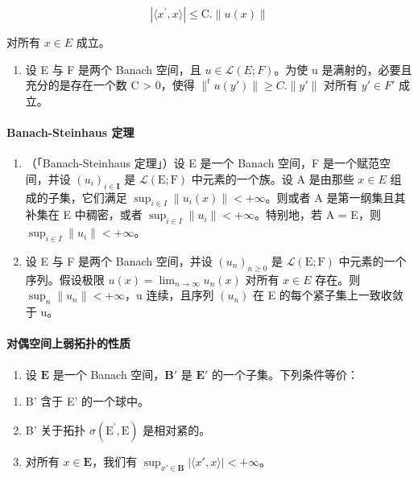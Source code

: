 \[
\left| \langle x ^ {\prime}, x \rangle \right| \leqslant \mathrm{C.} \| u (x) \|\tag{7}
\]

对所有 \(x \in E\) 成立。

\begin{enumerate}
\def\labelenumi{(\arabic{enumi})}
\setcounter{enumi}{14}
\tightlist
\item
   设 E 与 F 是两个 Banach 空间，且 \(u \in \mathcal{L}(E; F)\)。为使 u 是满射的，必要且充分的是存在一个数 C \textgreater{} 0，使得 \(\|^{t}u(y')\| \geqslant C. \|y'\|\) 对所有 \(y' \in F'\) 成立。
\end{enumerate}

\paragraph{Banach-Steinhaus 定理}

\begin{enumerate}
\def\labelenumi{\arabic{enumi})}
\setcounter{enumi}{15}
\item
  （「Banach-Steinhaus 定理」）设 E 是一个 Banach 空间，F 是一个赋范空间，并设 \((u_{i})_{i\in\mathbf{I}}\) 是 \(\mathcal{L}(\mathrm{E};\mathrm{F})\) 中元素的一个族。设 A 是由那些 \(x\in E\) 组成的子集，它们满足 \(\sup_{i\in I}\|u_{i}(x)\|<+\infty\)。则或者 A 是第一纲集且其补集在 E 中稠密，或者 \(\sup_{i\in I}\|u_{i}\|<+\infty\)。特别地，若 A = E，则 \(\sup_{i\in I}\|u_{i}\|<+\infty\)。
\item
  设 E 与 F 是两个 Banach 空间，并设 \((u_{n})_{n\geq0}\) 是 \(\mathcal{L}(\mathrm{E};\mathrm{F})\) 中元素的一个序列。假设极限 \(u(x)=\lim_{n\to\infty}u_{n}(x)\) 对所有 \(x\in E\) 存在。则 \(\sup_{n}\|u_{n}\|<+\infty\)，u 连续，且序列 \((u_{n})\) 在 E 的每个紧子集上一致收敛于 u。
\end{enumerate}

\paragraph{对偶空间上弱拓扑的性质}

\begin{enumerate}
\def\labelenumi{\arabic{enumi})}
\setcounter{enumi}{17}
\tightlist
\item
  设 \(\mathbf{E}\) 是一个 Banach 空间，\(\mathbf{B}'\) 是 \(\mathbf{E}'\) 的一个子集。下列条件等价：
\end{enumerate}

\begin{enumerate}
\def\labelenumi{(\roman{enumi})}
\item
  B' 含于 E' 的一个球中。
\item
  B' 关于拓扑 \(\sigma(\mathrm{E}^{\prime}, \mathrm{E})\) 是相对紧的。
\item
  对所有 \(x \in \mathbf{E}\)，我们有 \(\sup_{x' \in \mathbf{B}} |\langle x', x \rangle| < +\infty\)。
\end{enumerate}

